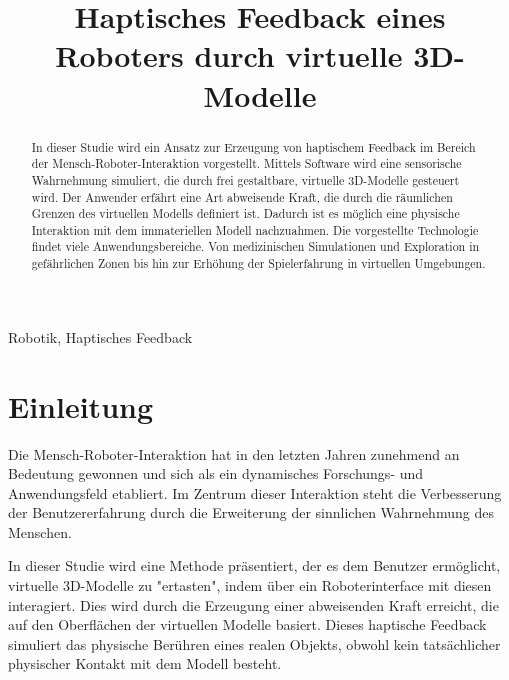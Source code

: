 \documentclass[conference]{IEEEtran}
\begin{document}
\title{Haptisches Feedback eines Roboters durch virtuelle 3D-Modelle}

\author{
    \and
}
\maketitle

\begin{abstract}
In dieser Studie wird ein Ansatz zur Erzeugung von haptischem Feedback im Bereich der Mensch-Roboter-Interaktion vorgestellt. Mittels Software wird eine sensorische Wahrnehmung simuliert, die durch frei gestaltbare, virtuelle 3D-Modelle gesteuert wird. Der Anwender erfährt eine Art abweisende Kraft, die durch die räumlichen Grenzen des virtuellen Modells definiert ist. Dadurch ist es möglich eine physische Interaktion mit dem immateriellen Modell nachzuahmen. Die vorgestellte Technologie findet viele Anwendungsbereiche. Von medizinischen Simulationen und Exploration in gefährlichen Zonen bis hin zur Erhöhung der Spielerfahrung in virtuellen Umgebungen.  

\end{abstract}

\begin{IEEEkeywords}
    Robotik, Haptisches Feedback 
\end{IEEEkeywords}

\section{Einleitung}
Die Mensch-Roboter-Interaktion hat in den letzten Jahren zunehmend an Bedeutung gewonnen und sich als ein dynamisches Forschungs- und Anwendungsfeld etabliert. Im Zentrum dieser Interaktion steht die Verbesserung der Benutzererfahrung durch die Erweiterung der sinnlichen Wahrnehmung des Menschen.

In dieser Studie wird eine Methode präsentiert, der es dem Benutzer ermöglicht, virtuelle 3D-Modelle zu "ertasten", indem über ein Roboterinterface mit diesen interagiert. Dies wird durch die Erzeugung einer abweisenden Kraft erreicht, die auf den Oberflächen der virtuellen Modelle basiert. Dieses haptische Feedback simuliert das physische Berühren eines realen Objekts, obwohl kein tatsächlicher physischer Kontakt mit dem Modell besteht. 
\end{document}
